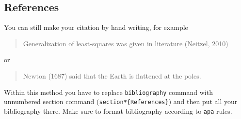 \documentclass{rgg}
\begin{document}
  \subsection{References}
    You can still make your citation by hand writing, for example
    \begin{quotation}
      Generalization of least-squares was given in literature (Neitzel, 2010)
    \end{quotation}
    or 
    \begin{quotation}
      Newton (1687) said that the Earth is flattened at the poles. 
    \end{quotation}
    Within this method you have to replace \texttt{bibliography}
    command with unnumbered section command (\texttt{section*\{References\}})
    and then put all your bibliography there. Make sure to format bibliography
    according to \texttt{apa} rules.
\end{document}
